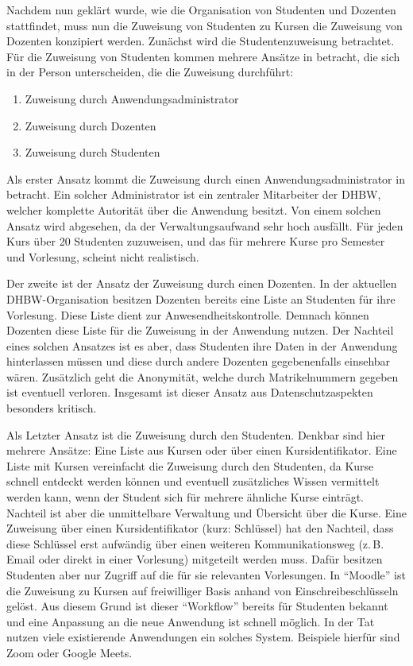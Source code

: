 Nachdem nun geklärt wurde, wie die Organisation von Studenten und Dozenten stattfindet, muss nun die Zuweisung von Studenten zu Kursen die Zuweisung von Dozenten konzipiert werden.
Zunächst wird die Studentenzuweisung betrachtet.
Für die Zuweisung von Studenten kommen mehrere Ansätze in betracht, die sich in der Person unterscheiden, die die Zuweisung durchführt:
\begin{enumerate}
    \item Zuweisung durch Anwendungsadministrator
    \item Zuweisung durch Dozenten
    \item Zuweisung durch Studenten
\end{enumerate}
Als erster Ansatz kommt die Zuweisung durch einen Anwendungsadministrator in betracht.
Ein solcher Administrator ist ein zentraler Mitarbeiter der DHBW, welcher komplette Autorität über die Anwendung besitzt.
Von einem solchen Ansatz wird abgesehen, da der Verwaltungsaufwand sehr hoch ausfällt.
Für jeden Kurs über 20 Studenten zuzuweisen, und das für mehrere Kurse pro Semester und Vorlesung, scheint nicht realistisch.

Der zweite ist der Ansatz der Zuweisung durch einen Dozenten.
In der aktuellen DHBW-Organisation besitzen Dozenten bereits eine Liste an Studenten für ihre Vorlesung.
Diese Liste dient zur Anwesendheitskontrolle.
Demnach können Dozenten diese Liste für die Zuweisung in der Anwendung nutzen.
Der Nachteil eines solchen Ansatzes ist es aber, dass Studenten ihre Daten in der Anwendung hinterlassen müssen und diese durch andere Dozenten gegebenenfalls einsehbar wären.
Zusätzlich geht die Anonymität, welche durch Matrikelnummern gegeben ist eventuell verloren.
Insgesamt ist dieser Ansatz aus Datenschutzaspekten besonders kritisch. %

Als Letzter Ansatz ist die Zuweisung durch den Studenten.
Denkbar sind hier mehrere Ansätze: Eine Liste aus Kursen oder über einen Kursidentifikator.
Eine Liste mit Kursen vereinfacht die Zuweisung durch den Studenten, da Kurse schnell entdeckt werden können und eventuell zusätzliches Wissen vermittelt werden kann, wenn der Student sich für mehrere ähnliche Kurse einträgt.
Nachteil ist aber die unmittelbare Verwaltung und Übersicht über die Kurse.
Eine Zuweisung über einen Kursidentifikator (kurz: Schlüssel) hat den Nachteil, dass diese Schlüssel erst aufwändig über einen weiteren Kommunikationsweg (z.\,B. Email oder direkt in einer Vorlesung) mitgeteilt werden muss.
Dafür besitzen Studenten aber nur Zugriff auf die für sie relevanten Vorlesungen.
In \enquote{Moodle} ist die Zuweisung zu Kursen auf freiwilliger Basis anhand von Einschreibeschlüsseln gelöst.
Aus diesem Grund ist dieser \enquote{Workflow} bereits für Studenten bekannt und eine Anpassung an die neue Anwendung ist schnell möglich.
In der Tat nutzen viele existierende Anwendungen ein solches System.
Beispiele hierfür sind Zoom oder Google Meets.

